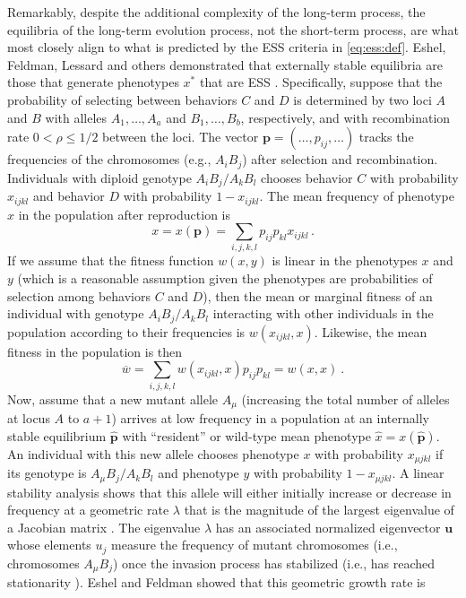 \documentclass[11pt]{article}
\newcommand{\mean}[1]{\overline{#1}}
\newcommand{\w}{w}
\newcommand{\ess}[1]{#1^*}
\newcommand{\fixp}[1]{\hat{#1}}
\renewcommand{\vec}[1]{\symbf{#1}}
\newcommand{\rec}{\rho}
\newcommand{\mut}{\mu}
\newcommand{\eig}{\lambda}
\begin{document}
Remarkably, despite the additional complexity of the long-term process, the equilibria of the long-term evolution process, not the short-term process, are what most closely align to what is predicted by the ESS criteria in \eqref{eq:ess:def}. Eshel, Feldman, Lessard and others demonstrated that externally stable equilibria are those that generate phenotypes $\ess{x}$ that are ESS \cite{Eshel:Feldman:1984,Liberman:1988,Eshel:1996,Hammerstein:Selten:1994,Hammerstein:1996,Weissing:1996,Eshel:Feldman:1998}. Specifically, suppose that the probability of selecting between behaviors $C$ and $D$ is determined by two loci $A$ and $B$ with alleles $A_{1},\ldots,A_{a}$ and $B_{1},\ldots,B_{b}$, respectively, and with recombination rate $0<\rec\le1/2$ between the loci. The vector $\vec{p} = (\ldots,p_{ij},\ldots)$ tracks the frequencies of the chromosomes (e.g., $A_{i} B_{j}$) after selection and recombination. Individuals with diploid genotype $A_{i}B_{j}/A_{k}B_{l}$ chooses behavior $C$ with probability $x_{ijkl}$ and behavior $D$ with probability $1 - x_{ijkl}$. The mean frequency of phenotype $x$ in the population after reproduction is
\begin{equation*}
  x = x(\vec{p}) = \sum_{i,j,k,l} p_{ij} p_{kl} x_{ijkl} \, .
\end{equation*}
If we assume that the fitness function $\w(x,y)$ is linear in the phenotypes $x$ and $y$ (which is a reasonable assumption given the phenotypes are probabilities of selection among behaviors $C$ and $D$), then the mean or marginal fitness of an individual with genotype $A_{i}B_{j}/A_{k}B_{l}$ interacting with other individuals in the population according to their frequencies is $w(x_{ijkl}, x)$. Likewise, the mean fitness in the population is then
\begin{equation*}
  \mean{w} = \sum_{i,j,k,l} w(x_{ijkl}, x) p_{ij} p_{kl} = w(x, x) \: .
\end{equation*}
Now, assume that a new mutant allele $A_{\mut}$ (increasing the total number of alleles at locus $A$ to $a+1$) arrives at low frequency in a population at an internally stable equilibrium $\fixp{\vec{p}}$ with ``resident'' or wild-type mean phenotype $\fixp{x} = x(\fixp{\vec{p}})$. An individual with this new allele chooses phenotype $x$ with probability $x_{\mut jkl}$ if its genotype is $A_{\mut}B_{j}/A_{k}B_{l}$ and phenotype $y$ with probability $1 - x_{\mut jkl}$. A linear stability analysis shows that this allele will either initially increase or decrease in frequency at a geometric rate $\eig$ that is the magnitude of the largest eigenvalue of a Jacobian matrix \cite{Edelstein-Keshet:2005}. The eigenvalue $\eig$ has an associated normalized eigenvector $\vec{u}$ whose elements $u_{j}$ measure the frequency of mutant chromosomes (i.e., chromosomes $A_{\mut} B_{j}$) once the invasion process has stabilized (i.e., has reached stationarity \cite{Caswell:2006}). Eshel and Feldman \cite{Eshel:Feldman:1984,Eshel:Feldman:1998} showed that this geometric growth rate is
\end{document}
